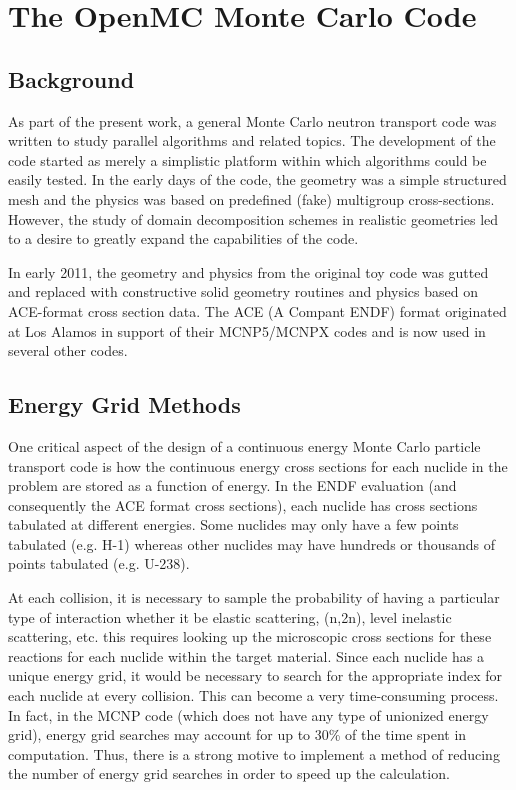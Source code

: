 \chapter{The OpenMC Monte Carlo Code}

\section{Background}

As part of the present work, a general Monte Carlo neutron transport code was
written to study parallel algorithms and related topics. The development of the
code started as merely a simplistic platform within which algorithms could be
easily tested. In the early days of the code, the geometry was a simple
structured mesh and the physics was based on predefined (fake) multigroup
cross-sections. However, the study of domain decomposition schemes in realistic
geometries led to a desire to greatly expand the capabilities of the code.

In early 2011, the geometry and physics from the original toy code was gutted
and replaced with constructive solid geometry routines and physics based on
ACE-format cross section data. The ACE (A Compant ENDF) format originated at Los
Alamos in support of their MCNP5/MCNPX codes and is now used in several other
codes.

\section{Energy Grid Methods}

One critical aspect of the design of a continuous energy Monte Carlo particle
transport code is how the continuous energy cross sections for each nuclide in
the problem are stored as a function of energy. In the ENDF evaluation (and
consequently the ACE format cross sections), each nuclide has cross sections
tabulated at different energies. Some nuclides may only have a few points
tabulated (e.g. H-1) whereas other nuclides may have hundreds or thousands of
points tabulated (e.g. U-238).

At each collision, it is necessary to sample the probability of having a
particular type of interaction whether it be elastic scattering, (n,2n), level
inelastic scattering, etc. this requires looking up the microscopic cross
sections for these reactions for each nuclide within the target material. Since
each nuclide has a unique energy grid, it would be necessary to search for the
appropriate index for each nuclide at every collision. This can become a very
time-consuming process. In fact, in the MCNP code (which does not have any type
of unionized energy grid), energy grid searches may account for up to 30\% of
the time spent in computation. Thus, there is a strong motive to implement a
method of reducing the number of energy grid searches in order to speed up the
calculation.

